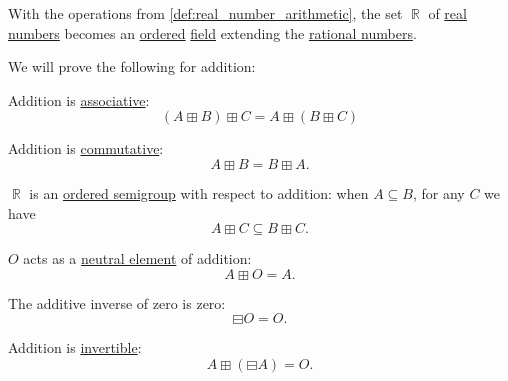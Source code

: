 \begin{proposition}\label{thm:field_of_real_numbers}
  With the operations from \cref{def:real_number_arithmetic}, the set \( \BbbR \) of \hyperref[def:real_numbers]{real numbers} becomes an \hyperref[def:ordered_semiring]{ordered} \hyperref[def:field]{field} extending the \hyperref[def:rational_numbers]{rational numbers}.

  We will prove the following for addition:
  \begin{thmenum}[series=thm:field_of_real_numbers]
     Addition is \hyperref[def:binary_operation/associative]{associative}:
    \begin{equation}\label{eq:thm:field_of_real_numbers/addition_associative}
      (A \boxplus B) \boxplus C = A \boxplus (B \boxplus C)
    \end{equation}

     Addition is \hyperref[def:binary_operation/commutative]{commutative}:
    \begin{equation}\label{eq:thm:field_of_real_numbers/addition_commutative}
      A \boxplus B = B \boxplus A.
    \end{equation}

     \( \BbbR \) is an \hyperref[def:ordered_semigroup]{ordered semigroup} with respect to addition: when \( A \subseteq B \), for any \( C \) we have
    \begin{equation}\label{eq:thm:field_of_real_numbers/addition_order}
      A \boxplus C \subseteq B \boxplus C.
    \end{equation}

      \( O \) acts as a \hyperref[def:semigroup_neutral_element]{neutral element} of addition:
    \begin{equation}\label{eq:thm:field_of_real_numbers/addition_neutral}
      A \boxplus O = A.
    \end{equation}

     The additive inverse of zero is zero:
    \begin{equation}\label{eq:thm:field_of_real_numbers/zero_additive_inverse}
      \boxminus O = O.
    \end{equation}

     Addition is \hyperref[def:monoid_inverse]{invertible}:
    \begin{equation}\label{eq:thm:field_of_real_numbers/addition_inverse}
      A \boxplus (\boxminus A) = O.
    \end{equation}


\end{thmenum}
\end{proposition}
